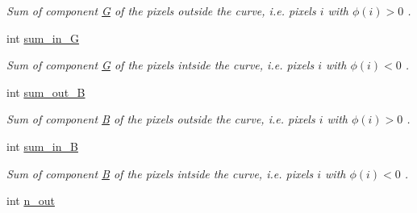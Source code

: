 \begin{DoxyCompactItemize}
\begin{DoxyCompactList}\small\item\em Sum of component \hyperlink{classofeli_1_1_a_cwithout_edges_y_u_v_a39d9c82c2cebebd133d9aaa4faa2eef0}{G} of the pixels outside the curve, i.\-e. pixels $i$ with $\phi \left( i\right) >0$ . \end{DoxyCompactList}\item 
\hypertarget{classofeli_1_1_a_cwithout_edges_y_u_v_aa9a1b8f6a101ea6f016ad318e780e7a4}{int \hyperlink{classofeli_1_1_a_cwithout_edges_y_u_v_aa9a1b8f6a101ea6f016ad318e780e7a4}{sum\-\_\-in\-\_\-\-G}}\label{classofeli_1_1_a_cwithout_edges_y_u_v_aa9a1b8f6a101ea6f016ad318e780e7a4}

\begin{DoxyCompactList}\small\item\em Sum of component \hyperlink{classofeli_1_1_a_cwithout_edges_y_u_v_a39d9c82c2cebebd133d9aaa4faa2eef0}{G} of the pixels intside the curve, i.\-e. pixels $i$ with $\phi \left( i\right) <0$ . \end{DoxyCompactList}\item 
\hypertarget{classofeli_1_1_a_cwithout_edges_y_u_v_a978f68f2ac215e14c532cf794ce46881}{int \hyperlink{classofeli_1_1_a_cwithout_edges_y_u_v_a978f68f2ac215e14c532cf794ce46881}{sum\-\_\-out\-\_\-\-B}}\label{classofeli_1_1_a_cwithout_edges_y_u_v_a978f68f2ac215e14c532cf794ce46881}

\begin{DoxyCompactList}\small\item\em Sum of component \hyperlink{classofeli_1_1_a_cwithout_edges_y_u_v_af11928f0c101c0487b497b4249e5d5e4}{B} of the pixels outside the curve, i.\-e. pixels $i$ with $\phi \left( i\right) >0$ . \end{DoxyCompactList}\item 
\hypertarget{classofeli_1_1_a_cwithout_edges_y_u_v_aee9f33db9baf2e45063258250090f68c}{int \hyperlink{classofeli_1_1_a_cwithout_edges_y_u_v_aee9f33db9baf2e45063258250090f68c}{sum\-\_\-in\-\_\-\-B}}\label{classofeli_1_1_a_cwithout_edges_y_u_v_aee9f33db9baf2e45063258250090f68c}

\begin{DoxyCompactList}\small\item\em Sum of component \hyperlink{classofeli_1_1_a_cwithout_edges_y_u_v_af11928f0c101c0487b497b4249e5d5e4}{B} of the pixels intside the curve, i.\-e. pixels $i$ with $\phi \left( i\right) <0$ . \end{DoxyCompactList}\item 
\hypertarget{classofeli_1_1_a_cwithout_edges_y_u_v_a034adbc67a268bd84539fe8e76b9deec}{int \hyperlink{classofeli_1_1_a_cwithout_edges_y_u_v_a034adbc67a268bd84539fe8e76b9deec}{n\-\_\-out}}\label{classofeli_1_1_a_cwithout_edges_y_u_v_a034adbc67a268bd84539fe8e76b9deec}


\end{DoxyCompactItemize}
